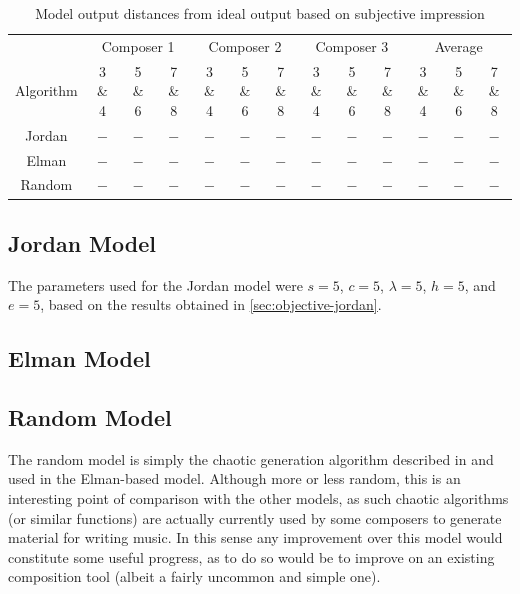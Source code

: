 \documentclass[ author={Stephen Livermore-Tozer},
				supervisor={Dr. Peter Flach},
				degree={MEng},
				title={Algorithmic Co-composition Using Machine Learning},
				subtitle={},
				type={research},
				year={2016} ]{dissertation}
\begin{document}
	\begin{table}[htp]
		\begin{center}
			\begin{tabular}{ccccccccccccc}
				\toprule
				& \multicolumn{3}{c}{Composer 1}& \multicolumn{3}{c}{Composer 2}& \multicolumn{3}{c}{Composer 3}& \multicolumn{3}{c}{Average}\\
				Algorithm& 3 \& 4 & 5 \& 6 & 7 \& 8 & 3 \& 4 & 5 \& 6 & 7 \& 8 & 3 \& 4 & 5 \& 6 & 7 \& 8 & 3 \& 4 & 5 \& 6 & 7 \& 8 \\
				\hline
				Jordan & $-$ & $-$ & $-$ & $-$ & $-$ & $-$ & $-$ & $-$ & $-$ & $-$ & $-$ & $-$\\
				Elman & $-$ & $-$ & $-$ & $-$ & $-$ & $-$ & $-$ & $-$ & $-$ & $-$ & $-$ & $-$\\
				Random & $-$ & $-$ & $-$ & $-$ & $-$ & $-$ & $-$ & $-$ & $-$ & $-$ & $-$ & $-$\\
				\bottomrule
			\end{tabular}
		\end{center}
		\caption{Model output distances from ideal output based on subjective impression}
		\label{tab:subjective-results}
	\end{table}
	
	\subsection{Jordan Model}
	
	The parameters used for the Jordan model were $s = 5$, $c = 5$, $\lambda = 5$, $h = 5$, and $e = 5$, based on the results obtained in \ref{sec:objective-jordan}. 
	
	
	\subsection{Elman Model}
	
	
	\subsection{Random Model}

	The random model is simply the chaotic generation algorithm described in \cite{coca2010characterizing} and used in the Elman-based model. Although more or less random, this is an interesting point of comparison with the other models, as such chaotic algorithms (or similar functions) are actually currently used by some composers to generate material for writing music. In this sense any improvement over this model would constitute some useful progress, as to do so would be to improve on an existing composition tool (albeit a fairly uncommon and simple one).
\end{document}
